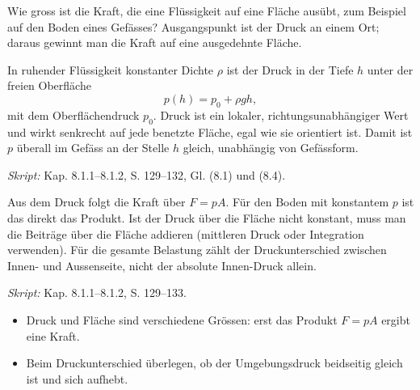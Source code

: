 
Wie gross ist die Kraft, die eine Flüssigkeit auf eine Fläche ausübt, zum
Beispiel auf den Boden eines Gefässes? Ausgangspunkt ist der Druck an einem
Ort; daraus gewinnt man die Kraft auf eine ausgedehnte Fläche.

\begin{werkzeugkasten}
In ruhender Flüssigkeit konstanter Dichte $\rho$ ist der Druck in der Tiefe
$h$ unter der freien Oberfläche
\begin{equation}
  p(h)=p_0+\rho gh,
\end{equation}
mit dem Oberflächendruck $p_0$. Druck ist ein lokaler, richtungsunabhängiger
Wert und wirkt senkrecht auf jede benetzte Fläche, egal wie sie orientiert
ist. Damit ist $p$ überall im Gefäss an der Stelle $h$ gleich, unabhängig von
Gefässform.

\textit{Skript:} Kap. 8.1.1--8.1.2, S. 129--132, Gl. (8.1) und (8.4).
\end{werkzeugkasten}

\begin{werkzeugkasten}
Aus dem Druck folgt die Kraft über $F=pA$. Für den Boden mit konstantem $p$
ist das direkt das Produkt. Ist der Druck über die Fläche nicht konstant,
muss man die Beiträge über die Fläche addieren (mittleren Druck oder
Integration verwenden). Für die gesamte Belastung zählt der Druckunterschied
zwischen Innen- und Aussenseite, nicht der absolute Innen-Druck allein.

\textit{Skript:} Kap. 8.1.1--8.1.2, S. 129--133.
\end{werkzeugkasten}

\begin{achtung}
\begin{itemize}
  \item Druck und Fläche sind verschiedene Grössen: erst das Produkt $F=pA$
        ergibt eine Kraft.
  \item Beim Druckunterschied überlegen, ob der Umgebungsdruck beidseitig
        gleich ist und sich aufhebt.
\end{itemize}
\end{achtung}
